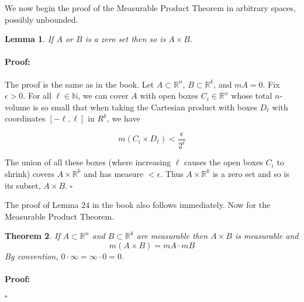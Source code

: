 \documentclass{article}
\newenvironment{proof}{\paragraph{Proof:}}{\hfill$\square$}
\newtheorem{theorem}{Theorem}
\newtheorem{lemma}[theorem]{Lemma}
\newcommand{\R}{\mathbb{R}}
\newcommand{\N}{\mathbb{N}}
\begin{document}
We now begin the proof of the Measurable Product Theorem in arbitrary spaces, possibly unbounded.

\begin{lemma}
If $A$ or $B$ is a zero set then so is $A \times B$.
\end{lemma}

\begin{proof}
The proof is the same as in the book. Let $A \subset \R^n$, $B \subset \R^k$, and $mA = 0$. Fix $\epsilon > 0$. For all $\ell \in \N$, we can cover $A$ with open boxes $C_i \in \R^n$ whose total $n$-volume is so small that when taking the Cartesian product with boxes $D_\ell$ with coordinates $[-\ell, \ell]$ in $R^k$, we have

\[
m(C_i \times D_\ell) < \frac{\epsilon}{2^\ell}
\]

The union of all these boxes (where increasing $\ell$ causes the open boxes $C_i$ to shrink) covers $A \times \R^k$ and has measure $<\epsilon$. Thus $A \times \R^k$ is a zero set and so is its subset, $A \times B$.
\end{proof}

The proof of Lemma 24 in the book also follows immediately. Now for the Measurable Product Theorem.

\begin{theorem}
If $A \subset \R^n$ and $B \subset \R^k$ are measurable then $A \times B$ is measurable and
\[
m(A \times B) = mA \cdot mB
\]
By convention, $0 \cdot \infty = \infty \cdot 0 = 0$.
\begin{proof}

\end{proof}
\end{theorem}
\end{document}
